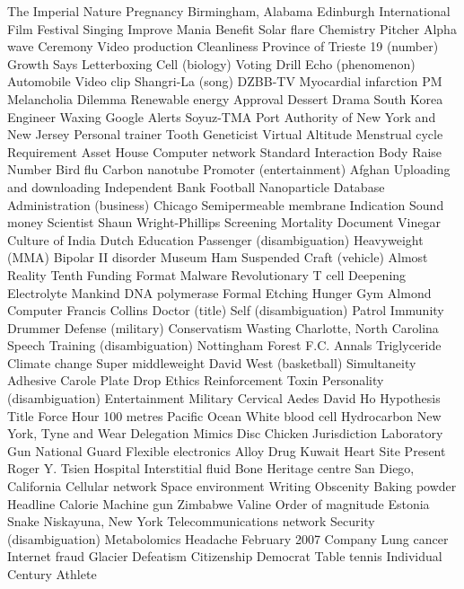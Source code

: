 The Imperial  Nature  Pregnancy  
Birmingham, Alabama  Edinburgh International Film Festival  Singing  
Improve  Mania  Benefit  
Solar flare  Chemistry  Pitcher  
Alpha wave  Ceremony  Video production  
Cleanliness  Province of Trieste  19 (number)  
Growth  Says  Letterboxing  
Cell (biology)  Voting  Drill  
Echo (phenomenon)  Automobile  Video clip  
Shangri-La (song)  DZBB-TV  Myocardial infarction  
PM  Melancholia  Dilemma  
Renewable energy  Approval  Dessert  
Drama  South Korea  Engineer  
Waxing  Google Alerts  Soyuz-TMA  
Port Authority of New York and New Jersey  Personal trainer  Tooth  
Geneticist  Virtual  Altitude  
Menstrual cycle  Requirement  Asset  
House  Computer network  Standard  
Interaction  Body  Raise  
Number  Bird flu  Carbon nanotube  
Promoter (entertainment)  Afghan  Uploading and downloading  
Independent Bank  Football  Nanoparticle  
Database  Administration (business)  Chicago  
Semipermeable membrane  Indication  Sound money  
Scientist  Shaun Wright-Phillips  Screening  
Mortality  Document  Vinegar  
Culture of India  Dutch  Education  
Passenger (disambiguation)  Heavyweight (MMA)  Bipolar II disorder  
Museum  Ham  Suspended  
Craft (vehicle)  Almost  Reality  
Tenth  Funding  Format  
Malware  Revolutionary  T cell  
Deepening  Electrolyte  Mankind  
DNA polymerase  Formal  Etching  
Hunger  Gym  Almond  
Computer  Francis Collins  Doctor (title)  
Self (disambiguation)  Patrol  Immunity  
Drummer  Defense (military)  Conservatism  
Wasting  Charlotte, North Carolina  Speech  
Training (disambiguation)  Nottingham Forest F.C.  Annals  
Triglyceride  Climate change  Super middleweight  
David West (basketball)  Simultaneity  Adhesive  
Carole  Plate  Drop  
Ethics  Reinforcement  Toxin  
Personality (disambiguation)  Entertainment  Military  
Cervical  Aedes  David Ho  
Hypothesis  Title  Force  
Hour  100 metres  Pacific Ocean  
White blood cell  Hydrocarbon  New York, Tyne and Wear  
Delegation  Mimics  Disc  
Chicken  Jurisdiction  Laboratory  
Gun  National Guard  Flexible electronics  
Alloy  Drug  Kuwait  
Heart  Site  Present  
Roger Y. Tsien  Hospital  Interstitial fluid  
Bone  Heritage centre  San Diego, California  
Cellular network  Space environment  Writing  
Obscenity  Baking powder  Headline  
Calorie  Machine gun  Zimbabwe  
Valine  Order of magnitude  Estonia  
Snake  Niskayuna, New York  Telecommunications network  
Security (disambiguation)  Metabolomics  Headache  
February 2007  Company  Lung cancer  
Internet fraud  Glacier  Defeatism  
Citizenship  Democrat  Table tennis  
Individual  Century  Athlete  
